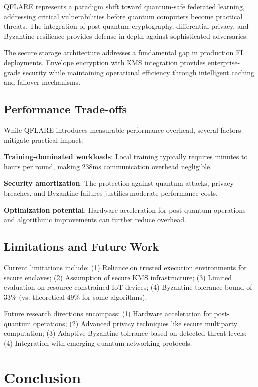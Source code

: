 \documentclass[conference]{IEEEtran}
\begin{document}
QFLARE represents a paradigm shift toward quantum-safe federated learning, addressing critical vulnerabilities before quantum computers become practical threats. The integration of post-quantum cryptography, differential privacy, and Byzantine resilience provides defense-in-depth against sophisticated adversaries.

The secure storage architecture addresses a fundamental gap in production FL deployments. Envelope encryption with KMS integration provides enterprise-grade security while maintaining operational efficiency through intelligent caching and failover mechanisms.

\subsection{Performance Trade-offs}

While QFLARE introduces measurable performance overhead, several factors mitigate practical impact:

\textbf{Training-dominated workloads}: Local training typically requires minutes to hours per round, making 238ms communication overhead negligible.

\textbf{Security amortization}: The protection against quantum attacks, privacy breaches, and Byzantine failures justifies moderate performance costs.

\textbf{Optimization potential}: Hardware acceleration for post-quantum operations and algorithmic improvements can further reduce overhead.

\subsection{Limitations and Future Work}

Current limitations include: (1) Reliance on trusted execution environments for secure enclaves; (2) Assumption of secure KMS infrastructure; (3) Limited evaluation on resource-constrained IoT devices; (4) Byzantine tolerance bound of 33\% (vs. theoretical 49\% for some algorithms).

Future research directions encompass: (1) Hardware acceleration for post-quantum operations; (2) Advanced privacy techniques like secure multiparty computation; (3) Adaptive Byzantine tolerance based on detected threat levels; (4) Integration with emerging quantum networking protocols.

\section{Conclusion}
\end{document}
